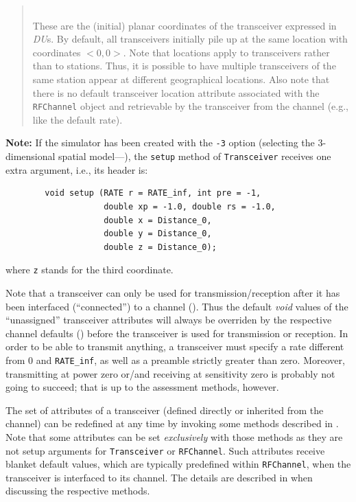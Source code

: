\begin{quote}
\noindent{}\\ \hspace{0in}
These are the (initial) planar coordinates of the transceiver expressed
in {\em DU\/}s.
By default, all transceivers initially pile up at the same location with
coordinates $<0,0>$.
Note that locations apply to transceivers rather than to stations.
Thus, it is possible to have multiple transceivers of the same station appear
at different geographical locations.
Also note that there is no default transceiver location attribute
associated with the {\tt RFChannel} object and retrievable by the transceiver
from the channel (e.g., like the default rate).
\end{quote}

\medskip

\noindent
{\bf Note:}
If the simulator has been created with the {\tt -3} option (selecting the
3-dimensional spatial model---), the {\tt setup} method of
{\tt Transceiver} receives one extra argument, i.e., its header is:
\begin{verbatim}
        void setup (RATE r = RATE_inf, int pre = -1,
                    double xp = -1.0, double rs = -1.0,
                    double x = Distance_0,
                    double y = Distance_0,
                    double z = Distance_0);
\end{verbatim}
\noindent
where {\tt z} stands for the third coordinate.

\medskip
Note that a transceiver can only be used for transmission/reception after it
has been interfaced (``connected'') to a channel ().
Thus the default {\em void\/}
values of the ``unassigned'' transceiver attributes
will always be overriden by the respective channel defaults
() before the transceiver is used for transmission or
reception.
In order to be able to transmit anything, a transceiver must specify a
rate different from 0 and {\tt RATE\_inf}, as well as a preamble strictly
greater than zero.
Moreover, transmitting at power zero or/and receiving at sensitivity zero
is probably not going to succeed;
that is up to the assessment methods, however.

The set of attributes of a transceiver (defined directly or
inherited from the channel) can be redefined at any time
by invoking some methods described in .
Note that some attributes can be set {\em exclusively\/} with those methods
as they are not setup arguments for {\tt Transceiver} or {\tt RFChannel}.
Such attributes receive blanket default values, which are typically
predefined within {\tt RFChannel}, when the transceiver is interfaced to its
channel.
The details are described in  when discussing the respective
methods.

